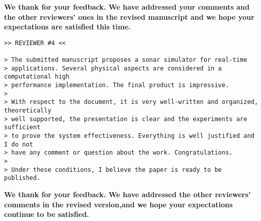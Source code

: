 \documentclass{article}
\begin{document}
\textbf{We thank for your feedback. We have addressed your comments and the other
reviewers' ones in the revised manuscript and we hope your expectations are
satisfied this time.}

\begin{verbatim}
>> REVIEWER #4 <<

> The submitted manuscript proposes a sonar simulator for real-time
> applications. Several physical aspects are considered in a computational high
> performance implementation. The final product is impressive.
>
> With respect to the document, it is very well-written and organized, theoretically
> well supported, the presentation is clear and the experiments are sufficient
> to prove the system effectiveness. Everything is well justified and I do not
> have any comment or question about the work. Congratulations.
>
> Under these conditions, I believe the paper is ready to be published.
\end{verbatim}

\textbf{We thank for your feedback. We have addressed the other reviewers' comments in the revised
version,and we hope your expectations continue to be satisfied.}
\end{document}
